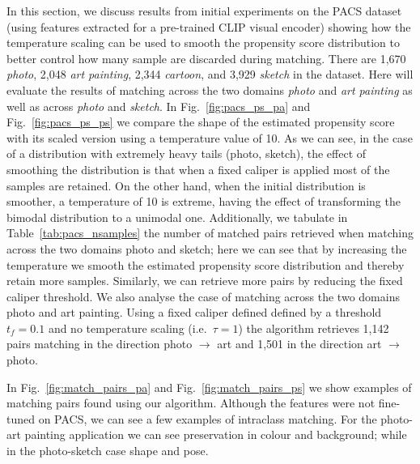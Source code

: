 In this section, we discuss results from initial experiments on the PACS
dataset~\citep{li2017deeper} (using features extracted for a pre-trained CLIP
\citep{radford2021learning} visual encoder) showing how the temperature scaling can be used to
smooth the propensity score distribution to better control how many sample are discarded during
matching. 
% 
There are 1,670 \emph{photo}, 2,048 \emph{art painting}, 2,344 \emph{cartoon}, and 3,929
\emph{sketch} in the dataset. Here will evaluate the results of matching across the two domains
\emph{photo} and \emph{art painting} as well as across \emph{photo} and \emph{sketch}.
% 
In Fig.~\ref{fig:pacs_ps_pa} and Fig.~\ref{fig:pacs_ps_ps} we compare the shape of the estimated
propensity score with its scaled version using a temperature value of 10. 
%
As we can see, in the case of a distribution with extremely heavy tails (photo, sketch), the effect
of smoothing the distribution is that when a fixed caliper is applied most of the samples are
retained. 
%
On the other hand, when the initial distribution is smoother, a temperature of 10 is extreme,
having the effect of transforming the bimodal distribution to a unimodal one.
% 
Additionally, we tabulate in Table~\ref{tab:pacs_nsamples} the number of matched pairs retrieved
when matching across the two domains photo and sketch; here we can see that by increasing the
temperature we smooth the estimated propensity score distribution and thereby retain more samples.
%
Similarly, we can retrieve more pairs by reducing the fixed caliper threshold. 
%
We also analyse the case of matching across the two domains photo and art painting. Using a fixed
caliper defined defined by a threshold \( t_f = 0.1 \) and no temperature scaling (i.e.\ $\tau=1$)
the algorithm retrieves 1,142 pairs matching in the direction photo $\to$ art and 1,501 in the
direction art $\to$ photo. 
% 

In Fig.~\ref{fig:match_pairs_pa} and Fig.~\ref{fig:match_pairs_ps} we show examples of matching
pairs found using our \CNN{} algorithm. Although the features were not fine-tuned on PACS, we can
see a few examples of intraclass matching. For the photo-art painting application we can see
preservation in colour and background; while in the photo-sketch case shape and pose.

